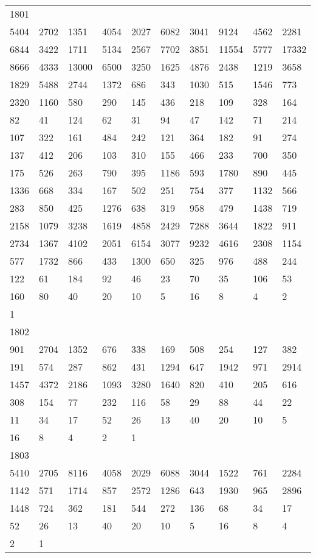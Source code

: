 \begin{longtable}{*{10}{l}}
1801&&&&&&&&&\\
5404& 2702& 1351& 4054& 2027& 6082& 3041& 9124& 4562& 2281\\
6844& 3422& 1711& 5134& 2567& 7702& 3851& 11554& 5777& 17332\\
8666& 4333& 13000& 6500& 3250& 1625& 4876& 2438& 1219& 3658\\
1829& 5488& 2744& 1372& 686& 343& 1030& 515& 1546& 773\\
2320& 1160& 580& 290& 145& 436& 218& 109& 328& 164\\
82& 41& 124& 62& 31& 94& 47& 142& 71& 214\\
107& 322& 161& 484& 242& 121& 364& 182& 91& 274\\
137& 412& 206& 103& 310& 155& 466& 233& 700& 350\\
175& 526& 263& 790& 395& 1186& 593& 1780& 890& 445\\
1336& 668& 334& 167& 502& 251& 754& 377& 1132& 566\\
283& 850& 425& 1276& 638& 319& 958& 479& 1438& 719\\
2158& 1079& 3238& 1619& 4858& 2429& 7288& 3644& 1822& 911\\
2734& 1367& 4102& 2051& 6154& 3077& 9232& 4616& 2308& 1154\\
577& 1732& 866& 433& 1300& 650& 325& 976& 488& 244\\
122& 61& 184& 92& 46& 23& 70& 35& 106& 53\\
160& 80& 40& 20& 10& 5& 16& 8& 4& 2\\
1& \\

1802&&&&&&&&&\\
901& 2704& 1352& 676& 338& 169& 508& 254& 127& 382\\
191& 574& 287& 862& 431& 1294& 647& 1942& 971& 2914\\
1457& 4372& 2186& 1093& 3280& 1640& 820& 410& 205& 616\\
308& 154& 77& 232& 116& 58& 29& 88& 44& 22\\
11& 34& 17& 52& 26& 13& 40& 20& 10& 5\\
16& 8& 4& 2& 1& \\

1803&&&&&&&&&\\
5410& 2705& 8116& 4058& 2029& 6088& 3044& 1522& 761& 2284\\
1142& 571& 1714& 857& 2572& 1286& 643& 1930& 965& 2896\\
1448& 724& 362& 181& 544& 272& 136& 68& 34& 17\\
52& 26& 13& 40& 20& 10& 5& 16& 8& 4\\
2& 1& \\


\end{longtable}
